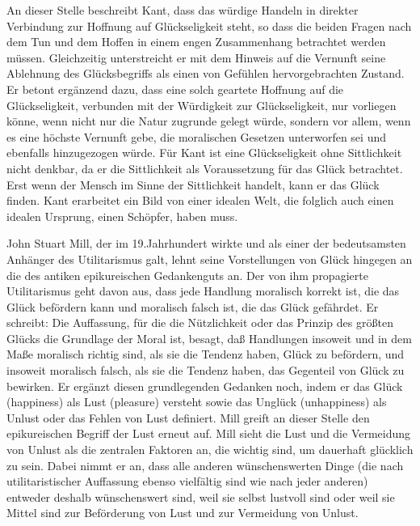An dieser Stelle beschreibt Kant, dass das würdige Handeln in direkter Verbindung zur Hoffnung auf Glückseligkeit steht, so dass die beiden Fragen nach dem Tun und dem Hoffen in einem engen Zusammenhang betrachtet werden müssen. 
Gleichzeitig unterstreicht er mit dem Hinweis auf die Vernunft seine Ablehnung des Glücksbegriffs als einen von Gefühlen hervorgebrachten Zustand. 
Er betont ergänzend dazu, dass eine solch geartete Hoffnung auf die Glückseligkeit, verbunden mit der Würdigkeit zur Glückseligkeit, nur vorliegen könne, wenn nicht nur die Natur zugrunde gelegt würde, sondern vor allem, wenn es eine höchste Vernunft gebe, die moralischen Gesetzen unterworfen sei und ebenfalls hinzugezogen würde.
Für Kant ist eine Glückseligkeit ohne Sittlichkeit nicht denkbar, da er die Sittlichkeit als Voraussetzung für das Glück betrachtet. 
Erst wenn der Mensch im Sinne der Sittlichkeit handelt, kann er das Glück finden. 
Kant erarbeitet ein Bild von einer idealen Welt, die folglich auch einen idealen Ursprung, einen Schöpfer, haben muss\cite[S.\,526]{IK73}.

John Stuart Mill, der im 19.Jahrhundert wirkte und als einer der bedeutsamsten Anhänger des Utilitarismus galt, lehnt seine Vorstellungen von Glück hingegen an die des antiken epikureischen Gedankenguts an. 
Der von ihm propagierte Utilitarismus geht davon aus, dass jede Handlung moralisch korrekt ist, die das Glück befördern kann und moralisch falsch ist, die das Glück gefährdet. 
Er schreibt: \glqq Die Auffassung, für die die Nützlichkeit oder das Prinzip des größten Glücks die Grundlage der Moral ist, besagt, daß Handlungen insoweit und in dem Maße moralisch richtig sind, als sie die Tendenz haben, Glück zu befördern, und insoweit moralisch falsch, als sie die Tendenz haben, das Gegenteil von Glück zu bewirken.\grqq{}\cite[S.\,13]{JM94}
Er ergänzt diesen grundlegenden Gedanken noch, indem er das Glück (happiness) als Lust (pleasure) versteht sowie das Unglück (unhappiness) als Unlust oder das Fehlen von Lust definiert. 
Mill greift an dieser Stelle den epikureischen Begriff der \glqq Lust\grqq{} erneut auf. 
Mill sieht die Lust und die Vermeidung von Unlust als die zentralen Faktoren an, die wichtig sind, um dauerhaft glücklich zu sein. 
Dabei nimmt er an, dass \glqq alle anderen wünschenswerten Dinge (die nach utilitaristischer Auffassung ebenso vielfältig sind wie nach jeder anderen) entweder deshalb wünschenswert sind, weil sie selbst lustvoll sind oder weil sie Mittel sind zur Beförderung von Lust und zur Vermeidung von Unlust.\grqq{}\cite[S.\,13]{JM94}

